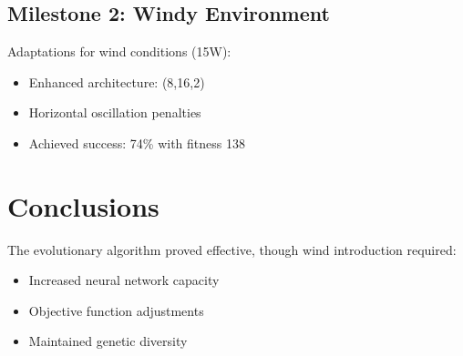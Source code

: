 \documentclass{article}
\begin{document}
\subsection{Milestone 2: Windy Environment}
Adaptations for wind conditions (15W):
\begin{itemize}
    \item Enhanced architecture: (8,16,2)
    \item Horizontal oscillation penalties
    \item Achieved success: 74\% with fitness 138
\end{itemize}

\section{Conclusions}
The evolutionary algorithm proved effective, though wind introduction required:
\begin{itemize}
    \item Increased neural network capacity
    \item Objective function adjustments
    \item Maintained genetic diversity
\end{itemize}
\end{document}
